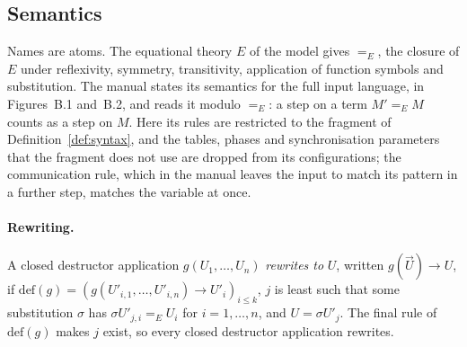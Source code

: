 \documentclass[11pt]{article}
\theoremstyle{definition}
\theoremstyle{plain}
\theoremstyle{remark}
\begin{document}
\subsection{Semantics}

Names are atoms. The equational theory $E$ of the model gives $=_E$, the closure of $E$ under reflexivity, symmetry, transitivity, application of function symbols and substitution. The manual states its semantics for the full input language, in Figures~B.1 and~B.2, and reads it modulo $=_E$: a step on a term $M'=_E M$ counts as a step on $M$. Here its rules are restricted to the fragment of Definition~\ref{def:syntax}, and the tables, phases and synchronisation parameters that the fragment does not use are dropped from its configurations; the communication rule, which in the manual leaves the input to match its pattern in a further step, matches the variable at once.

\paragraph{Rewriting.} A closed destructor application $g(U_1,\dots,U_n)$ \emph{rewrites to} $U$, written $g(\vec U)\to U$, if $\mathrm{def}(g)=(g(U'_{i,1},\dots,U'_{i,n})\to U'_i)_{i\le k}$, $j$ is least such that some substitution $\sigma$ has $\sigma U'_{j,i}=_E U_i$ for $i=1,\dots,n$, and $U=\sigma U'_j$. The final rule of $\mathrm{def}(g)$ makes $j$ exist, so every closed destructor application rewrites.
\end{document}
